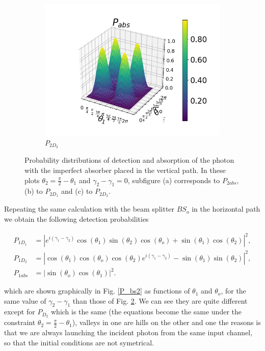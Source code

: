 \documentclass[12pt]{book}
\begin{document}
\begin{figure}[H]
\begin{subfigure}[b]{0.4\linewidth}
\includegraphics[width=\linewidth]{images/PAbs_BS_v.png}
\caption{$P_{2D_{2}}$}
\label{fig:BS2}
\end{subfigure}
\caption{Probability distributions of detection and absorption of the photon with the imperfect absorber placed in the vertical path. In these plots $\theta_{2}=\frac{\pi}{2}-\theta_{1}$ and $\gamma_{2}-\gamma_{1}=0$, subfigure (a) corresponds to $P_{2abs}$, (b) to $P_{2D_{1}}$ and (c) to $P_{2D_{2}}$.}
\label{P_bs_constraint}
\end{figure}

Repeating the same calculation with the beam splitter $BS_{o}$ in the horizontal path we obtain the following detection probabilities



\begin{align}
P_{1D_{1}}&=|e^{i(\gamma_{1}-\gamma_{2})}\cos(\theta_{1})\sin(\theta_{2})\cos(\theta_{o})+ \sin(\theta_{1})\cos(\theta_{2})|^2, \\
P_{1D_{2}}&=|\cos(\theta_{1})\cos(\theta_{o})\cos(\theta_{2})e^{i(\gamma_{1}-\gamma_{2})}- \sin(\theta_{1})\sin(\theta_{2})|^2,\\
P_{1abs}&=|\sin(\theta_{o}) \cos(\theta_{1})|^2 .
\end{align}

which are shown graphically in Fig. \ref{P_bs2} as functions of $\theta_{1}$ and $\theta_{o}$, for the same value of  $\gamma_{2}-\gamma_{1}$ than those of Fig. \ref{P_bs_constraint}. We can see they are quite different except for $P_{D_{2}}$ which is the same (the equations become the same under the constraint $\theta_{2}=\frac{\pi}{2}-\theta_{1}$), valleys in one are hills on the other and one the reasons is that we are always launching the incident photon from the same input channel, so that the initial conditions are not symetrical.
\end{document}
